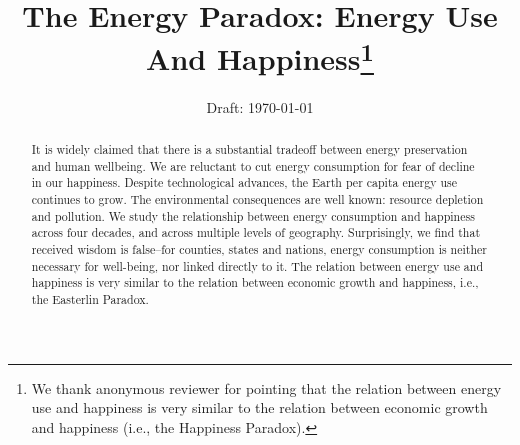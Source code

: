 \documentclass[10pt, letterpaper]{article}
\date{Draft: {}\today}
\title{ %
%  
The Energy Paradox: Energy Use And Happiness\footnote{We thank anonymous
  reviewer for pointing that the relation between energy use and happiness is very similar to the relation between economic growth and happiness (i.e., the Happiness Paradox).}%
}
\author{
}
\begin{document}



\maketitle
\vspace{-.4in}
\begin{center}
\end{center}

\begin{abstract}
\noindent  


It is widely claimed that there is a substantial tradeoff between energy
 preservation and human wellbeing. We are reluctant to cut energy
 consumption for fear of decline in our happiness. 
Despite technological advances, the Earth per capita energy use continues to grow.
The environmental consequences %
are well known:
resource depletion and pollution. %
%
 We study the relationship between energy consumption and happiness across four decades, and across multiple levels of geography.  Surprisingly, we find that received wisdom is false--for counties, states and nations, energy consumption is neither necessary for well-being, nor linked directly to it. The relation between energy use and happiness is very similar to the relation between economic growth and happiness, i.e., the Easterlin Paradox.



\end{abstract}


\vspace{.15in} 
\end{document}
